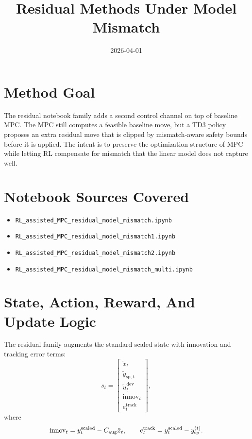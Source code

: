 \documentclass[11pt]{article}
\title{Residual Methods Under Model Mismatch}
\date{2026-04-01}
\begin{document}
\maketitle

\section*{Method Goal}

The residual notebook family adds a second control channel on top of baseline
MPC. The MPC still computes a feasible baseline move, but a TD3 policy proposes
an extra residual move that is clipped by mismatch-aware safety bounds before it
is applied. The intent is to preserve the optimization structure of MPC while
letting RL compensate for mismatch that the linear model does not capture well.

\section*{Notebook Sources Covered}

\begin{itemize}
\item \texttt{RL\_assisted\_MPC\_residual\_model\_mismatch.ipynb}
\item \texttt{RL\_assisted\_MPC\_residual\_model\_mismatch1.ipynb}
\item \texttt{RL\_assisted\_MPC\_residual\_model\_mismatch2.ipynb}
\item \texttt{RL\_assisted\_MPC\_residual\_model\_mismatch\_multi.ipynb}
\end{itemize}

\section*{State, Action, Reward, And Update Logic}

The residual family augments the standard scaled state with innovation and
tracking error terms:
\[
s_t =
\begin{bmatrix}
\tilde{x}_{t} \\
\tilde{y}_{\mathrm{sp},t} \\
\tilde{u}_{t}^{\mathrm{dev}} \\
\mathrm{innov}_t \\
e^{\mathrm{track}}_t
\end{bmatrix},
\]
where
\[
\mathrm{innov}_t = y_t^{\mathrm{scaled}} - C_{\mathrm{aug}} \hat{x}_t,
\qquad
e^{\mathrm{track}}_t = y_t^{\mathrm{scaled}} - y_{\mathrm{sp}}^{(t)}.
\]
\end{document}
